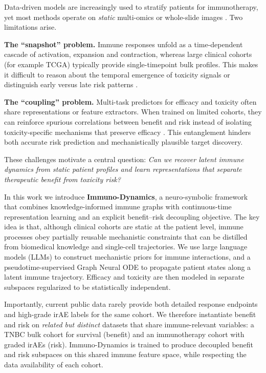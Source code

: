 \documentclass{article}
\begin{document}
Data-driven models are increasingly used to stratify patients for immunotherapy, yet most methods operate on \emph{static} multi-omics or whole-slide images \cite{lu2021data,chen2022pan}. Two limitations arise.

\noindent\textbf{The ``snapshot'' problem.}
Immune responses unfold as a time-dependent cascade of activation, expansion and contraction, whereas large clinical cohorts (for example TCGA) typically provide single-timepoint bulk profiles. This makes it difficult to reason about the temporal emergence of toxicity signals or distinguish early versus late risk patterns \cite{huang2020learning}.

\noindent\textbf{The ``coupling'' problem.}
Multi-task predictors for efficacy and toxicity often share representations or feature extractors. When trained on limited cohorts, they can reinforce spurious correlations between benefit and risk instead of isolating toxicity-specific mechanisms that preserve efficacy \cite{hussaini2021immune}. This entanglement hinders both accurate risk prediction and mechanistically plausible target discovery.

These challenges motivate a central question:
\emph{Can we recover latent immune dynamics from static patient profiles and learn representations that separate therapeutic benefit from toxicity risk?}

In this work we introduce \textbf{Immuno-Dynamics}, a neuro-symbolic framework that combines knowledge-informed immune graphs with continuous-time representation learning and an explicit benefit--risk decoupling objective. The key idea is that, although clinical cohorts are static at the patient level, immune processes obey partially reusable mechanistic constraints that can be distilled from biomedical knowledge and single-cell trajectories. We use large language models (LLMs) to construct mechanistic priors for immune interactions, and a pseudotime-supervised Graph Neural ODE to propagate patient states along a latent immune trajectory. Efficacy and toxicity are then modeled in separate subspaces regularized to be statistically independent.

Importantly, current public data rarely provide both detailed response endpoints and high-grade irAE labels for the same cohort. We therefore instantiate benefit and risk on \emph{related but distinct} datasets that share immune-relevant variables: a TNBC bulk cohort for survival (benefit) and an immunotherapy cohort with graded irAEs (risk). Immuno-Dynamics is trained to produce decoupled benefit and risk subspaces on this shared immune feature space, while respecting the data availability of each cohort.
\end{document}
